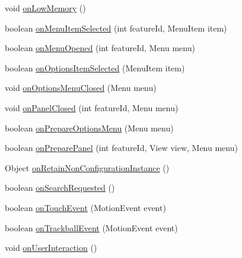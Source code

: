 \begin{DoxyCompactItemize}
\item 
void \hyperlink{classorg_1_1qtproject_1_1qt5_1_1android_1_1bindings_1_1_qt_activity_a60dde1c5c76102c0514119fbc9515450}{on\-Low\-Memory} ()
\item 
boolean \hyperlink{classorg_1_1qtproject_1_1qt5_1_1android_1_1bindings_1_1_qt_activity_a15f3f492aba46975a36f1ebdfbe5ba45}{on\-Menu\-Item\-Selected} (int feature\-Id, Menu\-Item item)
\item 
boolean \hyperlink{classorg_1_1qtproject_1_1qt5_1_1android_1_1bindings_1_1_qt_activity_afa718d6a5777a519b1d513d7cbda938a}{on\-Menu\-Opened} (int feature\-Id, Menu menu)
\item 
boolean \hyperlink{classorg_1_1qtproject_1_1qt5_1_1android_1_1bindings_1_1_qt_activity_a1062f0dfba41ba945835041b94bfe4fa}{on\-Options\-Item\-Selected} (Menu\-Item item)
\item 
void \hyperlink{classorg_1_1qtproject_1_1qt5_1_1android_1_1bindings_1_1_qt_activity_aad115f4cdaebb71916b85ac6309a83c4}{on\-Options\-Menu\-Closed} (Menu menu)
\item 
void \hyperlink{classorg_1_1qtproject_1_1qt5_1_1android_1_1bindings_1_1_qt_activity_a2b39eac5b8b7003b20171ddce6b16e37}{on\-Panel\-Closed} (int feature\-Id, Menu menu)
\item 
boolean \hyperlink{classorg_1_1qtproject_1_1qt5_1_1android_1_1bindings_1_1_qt_activity_a71a7e747de798c51b6a385b5e8a99c61}{on\-Prepare\-Options\-Menu} (Menu menu)
\item 
boolean \hyperlink{classorg_1_1qtproject_1_1qt5_1_1android_1_1bindings_1_1_qt_activity_a668c15554849a0bce9422eb709b5cacc}{on\-Prepare\-Panel} (int feature\-Id, View view, Menu menu)
\item 
Object \hyperlink{classorg_1_1qtproject_1_1qt5_1_1android_1_1bindings_1_1_qt_activity_a5954d45f88dd09deba757e671de9077d}{on\-Retain\-Non\-Configuration\-Instance} ()
\item 
boolean \hyperlink{classorg_1_1qtproject_1_1qt5_1_1android_1_1bindings_1_1_qt_activity_aa1c033b0b0bbc4cb9c193b239992fcb8}{on\-Search\-Requested} ()
\item 
boolean \hyperlink{classorg_1_1qtproject_1_1qt5_1_1android_1_1bindings_1_1_qt_activity_ada200302a153c7dbab3e55b746a7a179}{on\-Touch\-Event} (Motion\-Event event)
\item 
boolean \hyperlink{classorg_1_1qtproject_1_1qt5_1_1android_1_1bindings_1_1_qt_activity_a27faf58c38193faea2782ff85cedb567}{on\-Trackball\-Event} (Motion\-Event event)
\item 
void \hyperlink{classorg_1_1qtproject_1_1qt5_1_1android_1_1bindings_1_1_qt_activity_a3917d7d3ac6ab5bf31444d31b2784828}{on\-User\-Interaction} ()

\end{DoxyCompactItemize}
